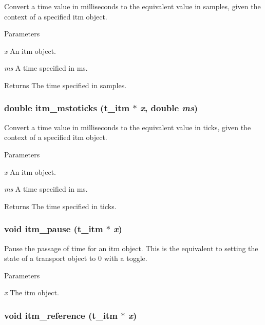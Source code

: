 Convert a time value in milliseconds to the equivalent value in samples, given the context of a specified itm object. 
\begin{DoxyParams}{Parameters}
\item[{\em x}]An itm object. \item[{\em ms}]A time specified in ms. \end{DoxyParams}
\begin{DoxyReturn}{Returns}
The time specified in samples. 
\end{DoxyReturn}
\hypertarget{group__time_gab32518269a1b30459b72e215567697ad}{
\subsubsection[{itm\_\-mstoticks}]{\setlength{\rightskip}{0pt plus 5cm}double itm\_\-mstoticks ({\bf t\_\-itm} $\ast$ {\em x}, \/  double {\em ms})}}
\label{group__time_gab32518269a1b30459b72e215567697ad}


Convert a time value in milliseconds to the equivalent value in ticks, given the context of a specified itm object. 
\begin{DoxyParams}{Parameters}
\item[{\em x}]An itm object. \item[{\em ms}]A time specified in ms. \end{DoxyParams}
\begin{DoxyReturn}{Returns}
The time specified in ticks. 
\end{DoxyReturn}
\hypertarget{group__time_ga844cd45c507bf4c89b91f2c2713fb128}{
\subsubsection[{itm\_\-pause}]{\setlength{\rightskip}{0pt plus 5cm}void itm\_\-pause ({\bf t\_\-itm} $\ast$ {\em x})}}
\label{group__time_ga844cd45c507bf4c89b91f2c2713fb128}


Pause the passage of time for an itm object. This is the equivalent to setting the state of a transport object to 0 with a toggle.


\begin{DoxyParams}{Parameters}
\item[{\em x}]The itm object. \end{DoxyParams}
\hypertarget{group__time_ga33f7a4627e3d2a77748b66d2af7a0a1a}{
\subsubsection[{itm\_\-reference}]{\setlength{\rightskip}{0pt plus 5cm}void itm\_\-reference ({\bf t\_\-itm} $\ast$ {\em x})}}
\label{group__time_ga33f7a4627e3d2a77748b66d2af7a0a1a}


